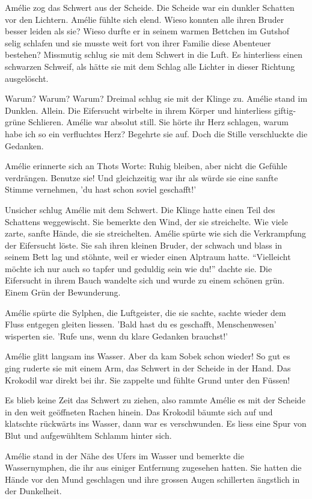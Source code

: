\documentclass[11pt,titlepage,a5paper]{book}
\begin{document}
Amélie zog das Schwert aus der Scheide. Die Scheide war ein dunkler Schatten vor den Lichtern. Amélie fühlte sich elend. Wieso konnten alle ihren Bruder besser leiden als sie? Wieso durfte er in seinem warmen Bettchen im Gutshof selig schlafen und sie musste weit fort von ihrer Familie diese Abenteuer bestehen? Missmutig schlug sie mit dem Schwert in die Luft. Es hinterliess einen schwarzen Schweif, als hätte sie mit dem Schlag alle Lichter in dieser Richtung ausgelöscht. 

Warum? Warum? Warum? Dreimal schlug sie mit der Klinge zu. Amélie stand im Dunklen. Allein. Die Eifersucht wirbelte in ihrem Körper und hinterliess giftig-grüne Schlieren. Amélie war absolut still. Sie hörte ihr Herz schlagen, warum habe ich so ein verfluchtes Herz? Begehrte sie auf. Doch die Stille verschluckte die Gedanken.

Amélie erinnerte sich an Thots Worte: Ruhig bleiben, aber nicht die Gefühle verdrängen. Benutze sie! Und gleichzeitig war ihr als würde sie eine sanfte Stimme vernehmen, 'du hast schon soviel geschafft!'

Unsicher schlug Amélie mit dem Schwert. Die Klinge hatte einen Teil des Schattens weggewischt. Sie bemerkte den Wind, der sie streichelte. Wie viele zarte, sanfte Hände, die sie streichelten. Amélie spürte wie sich die Verkrampfung der Eifersucht löste. Sie sah ihren kleinen Bruder, der schwach und blass in seinem Bett lag und stöhnte, weil er wieder einen Alptraum hatte. "`Vielleicht möchte ich nur auch so tapfer und geduldig sein wie du!"' dachte sie. Die Eifersucht in ihrem Bauch wandelte sich und wurde zu einem schönen grün. Einem Grün der Bewunderung.

Amélie spürte die Sylphen, die Luftgeister, die sie sachte, sachte wieder dem Fluss entgegen gleiten liessen. 'Bald hast du es geschafft, Menschenwesen' wisperten sie. 'Rufe uns, wenn du klare Gedanken brauchst!'

Amélie glitt langsam ins Wasser. Aber da kam Sobek schon wieder! So gut es ging ruderte sie mit einem Arm, das Schwert in der Scheide in der Hand. Das Krokodil war direkt bei ihr. Sie zappelte und fühlte Grund unter den Füssen! 

Es blieb keine Zeit das Schwert zu ziehen, also rammte Amélie es mit der Scheide in den weit geöffneten Rachen hinein. Das Krokodil bäumte sich auf und klatschte rückwärts ins Wasser, dann war es verschwunden. Es liess eine Spur von Blut und aufgewühltem Schlamm hinter sich. 

 Amélie stand in der Nähe des Ufers im Wasser und bemerkte die Wassernymphen, die ihr aus einiger Entfernung zugesehen hatten. Sie hatten die Hände vor den Mund geschlagen und ihre grossen Augen schillerten ängstlich in der Dunkelheit. 
 
\end{document}
